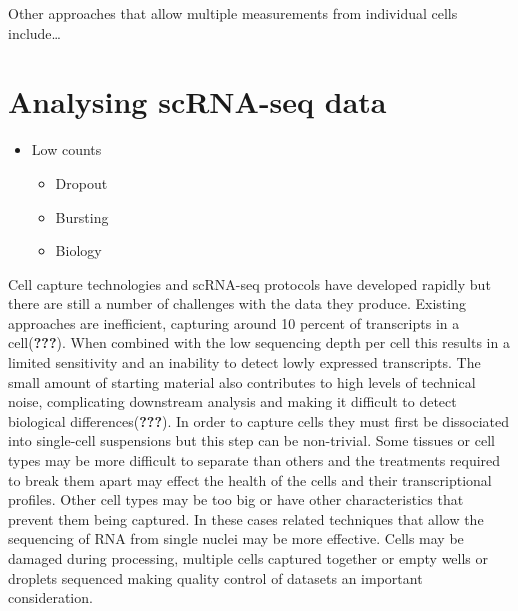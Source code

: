 \documentclass[11pt,a4paper,titlepage,twoside,openright]{style/unimelbthesis}
\theoremstyle{definition}
\theoremstyle{definition}
\theoremstyle{definition}
\theoremstyle{remark}
\begin{document}
\begin{mainmatter}
Other approaches that allow multiple measurements from individual cells include\ldots{}

\hypertarget{analysing-scrna-seq-data}{%
\section{Analysing scRNA-seq data}\label{analysing-scrna-seq-data}}

\begin{itemize}
\tightlist
\item
  Low counts

  \begin{itemize}
  \tightlist
  \item
    Dropout
  \item
    Bursting
  \item
    Biology
  \end{itemize}
\end{itemize}

Cell capture technologies and scRNA-seq protocols have developed rapidly but there are still a number of challenges with the data they produce. Existing approaches are inefficient, capturing around 10 percent of transcripts in a cell({\textbf{???}}). When combined with the low sequencing depth per cell this results in a limited sensitivity and an inability to detect lowly expressed transcripts. The small amount of starting material also contributes to high levels of technical noise, complicating downstream analysis and making it difficult to detect biological differences({\textbf{???}}). In order to capture cells they must first be dissociated into single-cell suspensions but this step can be non-trivial. Some tissues or cell types may be more difficult to separate than others and the treatments required to break them apart may effect the health of the cells and their transcriptional profiles. Other cell types may be too big or have other characteristics that prevent them being captured. In these cases related techniques that allow the sequencing of RNA from single nuclei may be more effective. Cells may be damaged during processing, multiple cells captured together or empty wells or droplets sequenced making quality control of datasets an important consideration.


\end{mainmatter}
\end{document}
